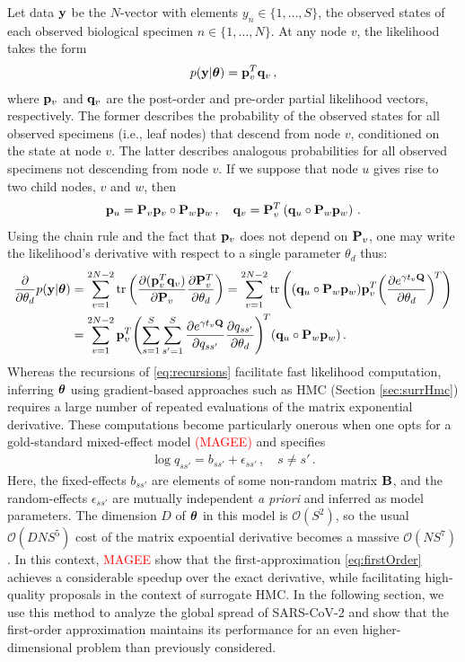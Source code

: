 \documentclass[12pt]{article} %
\begin{document}
 Let data $\y$ be the $N$-vector with elements $y_n\in \{1,\dots,S\}$, the observed states of each observed biological specimen $n \in \{1,\dots,N\}$.  At any node $v$, the likelihood takes the form \citep{ji2020gradients}
 \begin{align}
p(\y|\ttheta) = \p_v^T \q_v \, ,
 \end{align}
where $\p_v$ and $\q_v$ are the post-order and pre-order partial likelihood vectors, respectively.  The former describes the probability of the observed states for all observed specimens (i.e., leaf nodes) that descend from node $v$, conditioned on the state at node $v$. The latter describes analogous probabilities for all observed specimens not descending from node $v$.  If we suppose that node $u$ gives rise to two child nodes, $v$ and $w$, then 
\begin{align}\label{eq:recursions}
	\p_u = \P_v \p_v \circ \P_w \p_w\, ,  \quad \q_v= \P_v^T \left( \q_u \circ  \P_w \p_w\right) \, .
\end{align}
Using the chain rule and the fact that $\p_v$ does not depend on $\P_v$, one may write the likelihood's derivative with respect to a single parameter $\theta_d$ thus:
\begin{align}\label{eq:phyloGrad}
	\frac{\partial}{\partial \theta_d}  p(\y|\ttheta) 
	&=   \sum_{v=1}^{2N-2} \mbox{tr} \left( \frac{\partial (\p_v^T\q_v)}{\partial \P_v} \frac{\partial \P^T_v}{\partial \theta_d} \right)
	= \sum_{v=1}^{2N-2} \mbox{tr} \left(  (\q_u\circ \P_w\p_w) \p_v^T\bigg( \frac{\partial e^{\gamma t_v \QQ}}{\partial \theta_d}\bigg)^{\!T}\right)  \\ \nonumber
	&=\sum_{v=1}^{2N-2} \p_v^T \Biggl(\sum_{s=1}^S \sum_{s'=1}^S \frac{\partial e^{\gamma t_v \QQ}}{\partial q_{ss'}} \frac{\partial q_{ss'}}{\partial \theta_d} \Biggr)^{\!T} (\q_u\circ \P_w\p_w)  \, .
\end{align}
Whereas the recursions of \eqref{eq:recursions} facilitate fast likelihood computation, inferring $\ttheta$ using gradient-based approaches such as HMC (Section \ref{sec:surrHmc}) requires a large number of repeated evaluations of the matrix exponential derivative.  These computations become particularly onerous when one opts for a gold-standard mixed-effect model \textcolor{red}{(MAGEE)} and specifies
\begin{align}\label{eq:mixed}
\log q_{ss'} = b_{ss'} + \epsilon_{ss'} \,, \quad s\neq s'\, .
\end{align} 
Here, the fixed-effects $b_{ss'}$ are elements of some non-random matrix $\B$, and the random-effects $\epsilon_{ss'}$ are mutually independent \emph{a priori} and inferred as model parameters.  The dimension $D$ of $\ttheta$ in this model is $\mathcal{O}(S^2)$, so the usual $\mathcal{O}(DNS^5)$ cost of the matrix expoential derivative becomes a massive $\mathcal{O}(NS^7)$.  In this context, \textcolor{red}{MAGEE} show that the first-approximation \eqref{eq:firstOrder} achieves a considerable speedup over the exact derivative, while facilitating high-quality proposals in the context of surrogate HMC.  In the following section, we use this method to analyze the global spread of SARS-CoV-2 and show that the first-order approximation maintains its performance for an even higher-dimensional problem than previously considered.
\end{document}
